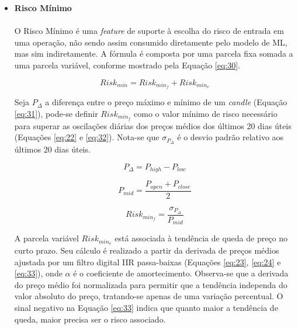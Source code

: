 \begin{itemize}

    \item \textbf{Risco Mínimo} \\ \\
    O Risco Mínimo é uma \textit{feature} de suporte à escolha do risco de entrada em uma operação, não sendo assim consumido diretamente pelo modelo de ML, mas sim indiretamente. A fórmula é composta por uma parcela fixa somada a uma parcela variável, conforme mostrado pela Equação \ref{eq:30}.

    \begin{equation} \label{eq:30}
        Risk_{min} = Risk_{min_f} + Risk_{min_v}
    \end{equation}

    Seja \begin{math} P_{\Delta} \end{math} a diferença entre o preço máximo e mínimo de um \textit{candle} (Equação \ref{eq:31}), pode-se definir \begin{math} Risk_{min_f} \end{math} como o valor mínimo de risco necessário para superar as oscilações diárias dos preços médios dos últimos 20 dias úteis (Equações \ref{eq:22} e \ref{eq:32}). Nota-se que \begin{math} \sigma_{P_{\Delta}} \end{math} é o desvio padrão relativo aos últimos 20 dias úteis.

    \begin{equation} \label{eq:31}
        P_{\Delta} = P_{high} - P_{low}
    \end{equation}

    \begin{equation} \label{eq:22}
        P_{mid} = \dfrac{P_{open} + P_{close}}{2}
    \end{equation}

    \begin{equation} \label{eq:32}
        Risk_{min_f} = \dfrac{ \sigma_{P_{\Delta}} }{ P_{mid} }
    \end{equation}

    A parcela variável \begin{math} Risk_{min_v} \end{math} está associada à tendência de queda de preço no curto prazo. Seu cálculo é realizado a partir da derivada de preços médios ajustada por um filtro digital IIR passa-baixas \cite{haykin2007signals} (Equações \ref{eq:23}, \ref{eq:24} e \ref{eq:33}), onde \begin{math} \alpha \end{math} é o coeficiente de amortecimento. Observa-se que a derivada do preço médio foi normalizada para permitir que a tendência independa do valor absoluto do preço, tratando-se apenas de uma variação percentual. O sinal negativo na Equação \ref{eq:33} indica que quanto maior a tendência de queda, maior precisa ser o risco associado.


\end{itemize}
